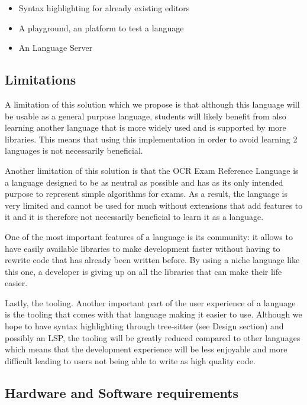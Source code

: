 \documentclass{article}
\begin{document}
\begin{itemize}
    \item{Syntax highlighting for already existing editors}
    \item{A playground, an platform to test a language}
    \item{An Language Server}
\end{itemize}

\subsection{Limitations}


A limitation of this solution which we propose is that although this language
will be usable as a general purpose language, students will likely benefit from
also learning another language that is more widely used and is supported by
more libraries. This means that using this implementation in order to avoid
learning 2 languages is not necessarily beneficial.

Another limitation of this solution is that the OCR Exam Reference Language is
a language designed to be as neutral as possible and has as its only intended
purpose to represent simple algorithms for exams. As a result, the language is
very limited and cannot be used for much without extensions that add features
to it and it is therefore not necessarily beneficial to learn it as a language.

One of the most important features of a language is its community: it
allows to have easily available libraries to make development faster without
having to rewrite code that has already been written before. By using a niche
language like this one, a developer is giving up on all the libraries that can
make their life easier.


Lastly, the tooling. Another important part of the user experience of a
language is the tooling that comes with that language making it easier to use.
Although we hope to have syntax highlighting through tree-sitter (see Design
section) and possibly an LSP, the tooling will be greatly reduced compared to
other languages which means that the development experience will be less
enjoyable and more difficult leading to users not being able to write as high
quality code.

\subsection{Hardware and Software requirements}
\end{document}
